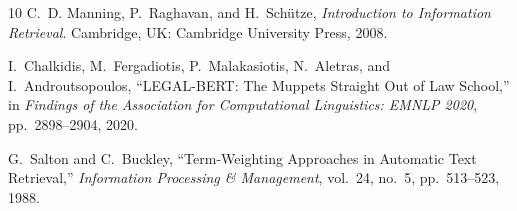\begin{thebibliography}{10}
C.~D. Manning, P.~Raghavan, and H.~Sch{\"u}tze,
\textit{Introduction to Information Retrieval}. Cambridge, UK: Cambridge University Press, 2008.

I.~Chalkidis, M.~Fergadiotis, P.~Malakasiotis, N.~Aletras, and I.~Androutsopoulos,
``LEGAL-BERT: The Muppets Straight Out of Law School,''
in \textit{Findings of the Association for Computational Linguistics: EMNLP 2020}, pp.~2898--2904, 2020.

G.~Salton and C.~Buckley,
``Term-Weighting Approaches in Automatic Text Retrieval,''
\textit{Information Processing \& Management}, vol.~24, no.~5, pp.~513--523, 1988.

\end{thebibliography}
\endgroup
